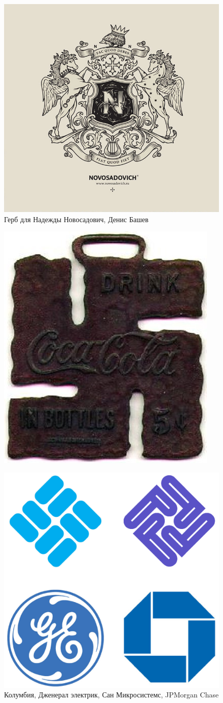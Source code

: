 \begin{figure}[h]
  \centering
  \includegraphics[width=.5\linewidth]{images/cross2}
  \caption{Герб для Надежды Новосадович, Денис Башев}
  \label{fig:cross2}
\end{figure}

\begin{figure}[h]
  \centering
  \includegraphics[width=.5\linewidth]{images/cocaswastica}
  \caption{}  %
  \label{fig:cocaswastica}
\end{figure}

\begin{figure}[h]
  \centering
  \includegraphics[width=.5\linewidth]{images/swastica}
  \caption{Колумбия, Дженерал электрик, Сан Микросистемс, JPMorgan Chase}
  \label{fig:swastica}
\end{figure}

